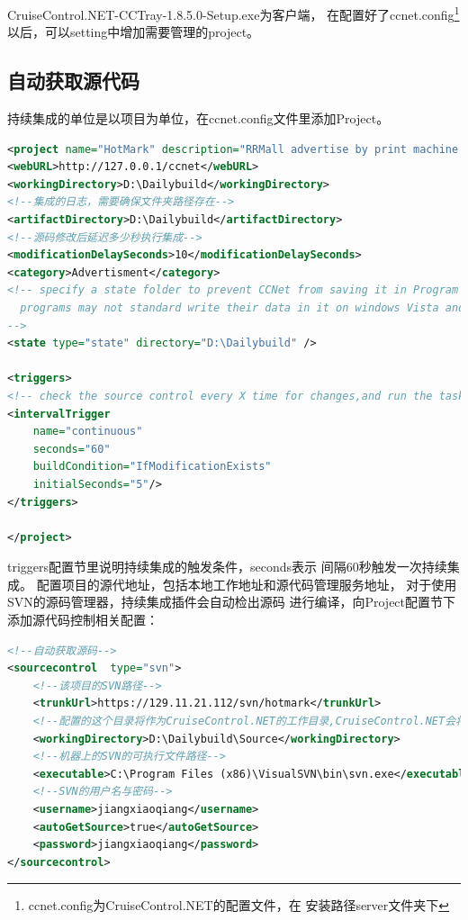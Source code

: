\documentclass{book}
\begin{document}
CruiseControl.NET-CCTray-1.8.5.0-Setup.exe为客户端，
在配置好了ccnet.config\footnote{ccnet.config为CruiseControl.NET的配置文件，在
安装路径server文件夹下}以后，可以setting中增加需要管理的project。

\subsection{自动获取源代码}

持续集成的单位是以项目为单位，在ccnet.config文件里添加Project。

\begin{lstlisting}[language=XML]
<project name="HotMark" description="RRMall advertise by print machine." queue="Q1">
<webURL>http://127.0.0.1/ccnet</webURL>
<workingDirectory>D:\Dailybuild</workingDirectory>	
<!--集成的日志，需要确保文件夹路径存在-->
<artifactDirectory>D:\Dailybuild</artifactDirectory>	
<!--源码修改后延迟多少秒执行集成-->
<modificationDelaySeconds>10</modificationDelaySeconds>
<category>Advertisment</category>	
<!-- specify a state folder to prevent CCNet from saving it in Program Files\CruiseControl.NET\server 
  programs may not standard write their data in it on windows Vista and up)
-->
<state type="state" directory="D:\Dailybuild" /> 

<triggers>
<!-- check the source control every X time for changes,and run the tasks if changes are found -->
<intervalTrigger
	name="continuous"
	seconds="60"
	buildCondition="IfModificationExists"
	initialSeconds="5"/>
</triggers>

</project>
\end{lstlisting}

triggers配置节里说明持续集成的触发条件，seconds表示
间隔60秒触发一次持续集成。
配置项目的源代地址，包括本地工作地址和源代码管理服务地址，
对于使用SVN的源码管理器，持续集成插件会自动检出源码
进行编译，向Project配置节下添加源代码控制相关配置：

\begin{lstlisting}[language=XML]
<!--自动获取源码-->
<sourcecontrol 	type="svn">
	<!--该项目的SVN路径-->
    <trunkUrl>https://129.11.21.112/svn/hotmark</trunkUrl>  
    <!--配置的这个目录将作为CruiseControl.NET的工作目录,CruiseControl.NET会将代码从SVN中check out到这个目录中.-->
    <workingDirectory>D:\Dailybuild\Source</workingDirectory>  
    <!--机器上的SVN的可执行文件路径-->
    <executable>C:\Program Files (x86)\VisualSVN\bin\svn.exe</executable>  
    <!--SVN的用户名与密码-->
    <username>jiangxiaoqiang</username>
	<autoGetSource>true</autoGetSource>
    <password>jiangxiaoqiang</password>
</sourcecontrol>
\end{lstlisting}
\end{document}
